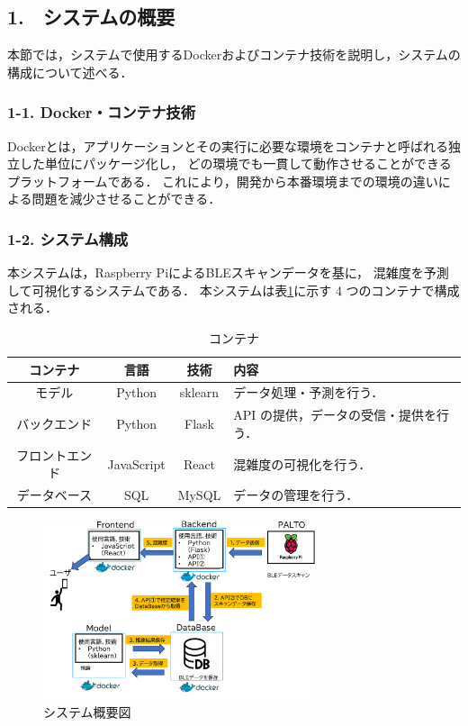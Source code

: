 \subsection*{1.　システムの概要}


本節では，システムで使用するDockerおよびコンテナ技術を説明し，システムの構成について述べる．


\subsubsection*{1-1. Docker・コンテナ技術}

Dockerとは，アプリケーションとその実行に必要な環境をコンテナと呼ばれる独立した単位にパッケージ化し，
どの環境でも一貫して動作させることができるプラットフォームである\cite{Docker}．
これにより，開発から本番環境までの環境の違いによる問題を減少させることができる．

\subsubsection*{1-2. システム構成}

本システムは，Raspberry PiによるBLEスキャンデータを基に，
混雑度を予測して可視化するシステムである．
本システムは表\ref{tbl:コンテナ}に示す 4 つのコンテナで構成される．

\begin{table}[tb]
	\centering
	\caption{コンテナ}
	\label{tbl:コンテナ}
	\small
	\doublerulesep=0.3pt
	\begin{tabular}{cccp{3cm}} \hline\hline\hline
		コンテナ & 言語 & 技術 & 内容 \\ \hline
		モデル & Python & sklearn &  データ処理・予測を行う． \\
		バックエンド & Python & Flask & API の提供，データの受信・提供を行う． \\
		フロントエンド & JavaScript & React & 混雑度の可視化を行う． \\
		データベース & SQL & MySQL & データの管理を行う． \\  \hline
	\end{tabular}
\end{table}

\begin{figure}[tb]
	\centering
	\includegraphics[width=8cm]{./outline_drawing.pdf}
	\caption{システム概要図}
	\label{fig:システム概要図}
\end{figure}

